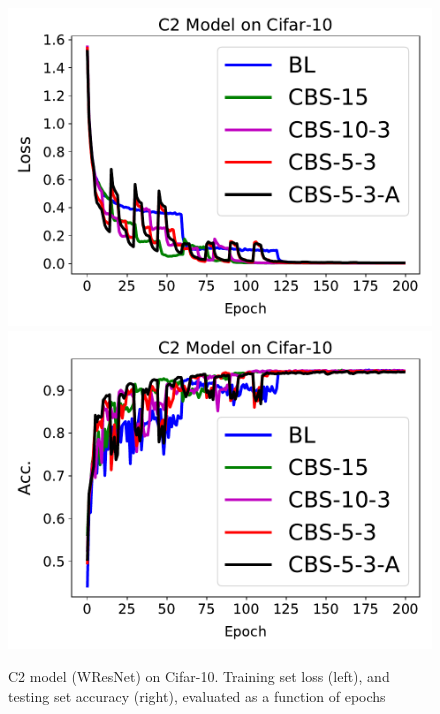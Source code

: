 \begin{figure}[!htbp]
  \centering
\includegraphics[width=.4\textwidth]{fig/loss_c1.pdf}
\includegraphics[width=.4\textwidth]{fig/acc_c1.pdf}
  \caption{\footnotesize C2 model (WResNet) on Cifar-10. Training set loss (left), and testing set accuracy (right), evaluated as a function of epochs}

  \label{fig:wresnet_cifar10}
\end{figure}

